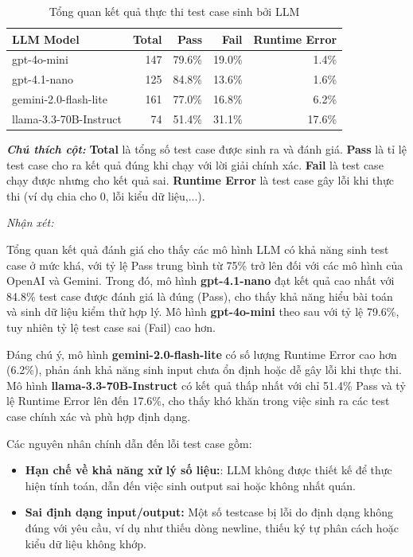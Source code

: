 \begin{table}[H]
\centering
\caption{Tổng quan kết quả thực thi test case sinh bởi LLM}
\begin{tabular}{lrrrr}
\toprule
\textbf{LLM Model} & \textbf{Total} & \textbf{Pass} & \textbf{Fail} & \textbf{Runtime Error} \\
\midrule
gpt-4o-mini            & 147 & 79.6\% & 19.0\% & 1.4\%  \\
gpt-4.1-nano           & 125 & 84.8\% & 13.6\% & 1.6\%  \\
gemini-2.0-flash-lite  & 161 & 77.0\% & 16.8\% & 6.2\% \\
llama-3.3-70B-Instruct & 74  & 51.4\% & 31.1\% & 17.6\% \\
\bottomrule
\end{tabular}

\vspace{0.5em}
\noindent
\textit{\textbf{Chú thích cột:}} 
\textbf{Total} là tổng số test case được sinh ra và đánh giá. 
\textbf{Pass} là tỉ lệ test case cho ra kết quả đúng khi chạy với lời giải chính xác. 
\textbf{Fail} là test case chạy được nhưng cho kết quả sai. 
\textbf{Runtime Error} là test case gây lỗi khi thực thi (ví dụ chia cho 0, lỗi kiểu dữ liệu,...).
\end{table}

\emph{Nhận xét: }

Tổng quan kết quả đánh giá cho thấy các mô hình LLM có khả năng sinh test case ở mức khá, với tỷ lệ Pass trung bình từ 75\% trở lên đối với các mô hình của OpenAI và Gemini. Trong đó, mô hình \textbf{gpt-4.1-nano} đạt kết quả cao nhất với 84.8\% test case được đánh giá là đúng (Pass), cho thấy khả năng hiểu bài toán và sinh dữ liệu kiểm thử hợp lý. Mô hình \textbf{gpt-4o-mini} theo sau với tỷ lệ 79.6\%, tuy nhiên tỷ lệ test case sai (Fail) cao hơn.

Đáng chú ý, mô hình \textbf{gemini-2.0-flash-lite} có số lượng Runtime Error cao hơn (6.2\%), phản ánh khả năng sinh input chưa ổn định hoặc dễ gây lỗi khi thực thi. Mô hình \textbf{llama-3.3-70B-Instruct} có kết quả thấp nhất với chỉ 51.4\% Pass và tỷ lệ Runtime Error lên đến 17.6\%, cho thấy khó khăn trong việc sinh ra các test case chính xác và phù hợp định dạng.

Các nguyên nhân chính dẫn đến lỗi test case gồm:
\begin{itemize}
    \item \textbf{Hạn chế về khả năng xử lý số liệu:}: LLM không được thiết kế để thực hiện tính toán, dẫn đến việc sinh output sai hoặc không nhất quán.
    \item \textbf{Sai định dạng input/output:} Một số testcase bị lỗi do định dạng không đúng với yêu cầu, ví dụ như thiếu dòng newline, thiếu ký tự phân cách hoặc kiểu dữ liệu không khớp.
\end{itemize}
